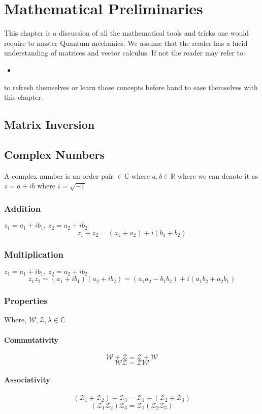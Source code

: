 \chapter{Mathematical Preliminaries}
This chapter is a discussion of all the mathematical tools and tricks one would require to master Quantum mechanics. We assume that the reader has a lucid understanding of matrices and vector calculus. If not the reader may refer to:
\begin{itemize}
	\item 
\end{itemize}
to refresh themselves or learn those concepts before hand to ease themselves with this chapter.
\section{Matrix Inversion}
\section{Complex Numbers}
A complex number is an order pair ${} \in \mathbb{C}$ where $a,b \in \mathbb{R}$ where we can denote it as $z = a + ib$ where $i = \sqrt{-1}$
\subsection{Addition}
$z_{1} = a_{1} + ib_{1}, \ z_{2} = a_{2} + ib_{2}$
$$z_{1} + z_{2} =  (a_{1} + a_{2}) + i(b_{1} + b_{2})$$
\subsection{Multiplication}
$z_{1} = a_{1} + ib_{1}, \ z_{2} = a_{2} + ib_{2}$
$$z_{1}z_{2} =  (a_{1} + ib_{1})(a_{2} + ib_{2}) = (a_{1}a_{2} - b_{1}b_{2}) + i(a_{1}b_{2} + a_{2}b_{1})$$
\subsection{Properties}
Where, $\mathcal{W}, \mathcal{Z}, \lambda \in \mathbb{C}$
\subsubsection{Commutativity}
$$\mathcal{W} + \mathcal{Z} = \mathcal{Z} + \mathcal{W}$$
$$\mathcal{W}\mathcal{Z} = \mathcal{Z}\mathcal{W}$$
\subsubsection{Associativity}
$$(\mathcal{Z}_1 + \mathcal{Z}_2) + \mathcal{Z}_3 = \mathcal{Z}_1 + (\mathcal{Z}_2 + \mathcal{Z}_3)$$
$$(\mathcal{Z}_1\mathcal{Z}_2)\mathcal{Z}_3 = \mathcal{Z}_1(\mathcal{Z}_2\mathcal{Z}_3)$$
